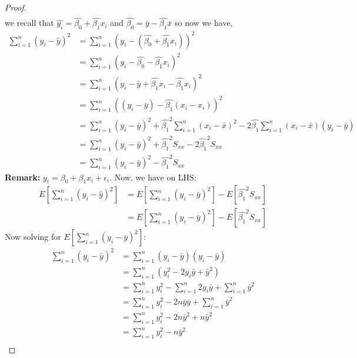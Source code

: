 \documentclass[12pt]{article}
\begin{document}
\begin{enumerate}[1.]
\begin{proof}
\begin{align*}
            \end{align*}
            we recall that $\hat{y_i} = \hat{\beta_0} + \hat{\beta_1}x_i$ and $\hat{\beta_0} = \bar{y} - \hat{\beta_1} \bar{x}$ so now we have,
            \begin{align*}
                \sum_{i=1}^{n} (y_i - \hat{y})^2 &= \sum_{i=1}^{n} (y_i - (\hat{\beta_0} + \hat{\beta_1}x_i))^2 \\
                &= \sum_{i=1}^{n} (y_i - \hat{\beta_0} - \hat{\beta_1}x_i)^2 \\
                &= \sum_{i=1}^{n} (y_i - \bar{y} + \hat{\beta_1} x_i - \hat{\beta_1}x_i)^2 \\
                &= \sum_{i=1}^{n} ((y_i - \bar{y}) - \hat{\beta_1} (x_i - x_i))^2 \\
                &=\sum_{i=1}^{n} (y_i-\bar{y})^2 + \hat{\beta_1}^2 \sum_{i=1}^{n} (x_i-\bar{x})^2 - 2\hat{\beta_1} \sum_{i=1}^{n} (x_i-\bar{x})(y_i-\bar{y})\\
                &=\sum_{i=1}^{n} (y_i-\bar{y})^2 + \hat{\beta_1}^2 S_{xx} - 2\hat{\beta_1}^2 S_{xx}\\
                &=\sum_{i=1}^{n} (y_i-\bar{y})^2 - \hat{\beta_1}^2 S_{xx}
            \end{align*}
            \textbf{Remark:} $y_i=\beta_0+\beta_1x_i+\epsilon_i$. Now, we have on LHS$\colon$
            \begin{align*}
                E[\sum_{i=1}^{n} (y_i - \hat{y})^2] &= E[\sum_{i=1}^{n} (y_i-\bar{y})^2] - E[\hat{\beta_1}^2 S_{xx}] \\
                &= E[\sum_{i=1}^{n} (y_i-\bar{y})^2] - E[\hat{\beta_1}^2 S_{xx}]
            \end{align*}
            Now solving for $E[\sum_{i=1}^{n} (y_i-\bar{y})^2]$:
            \begin{align*}
                \sum_{i=1}^{n} (y_i-\bar{y})^2 &= \sum_{i=1}^{n} (y_i - \bar{y})(y_i - \bar{y}) \\
                &= \sum_{i=1}^{n} (y_i^2 - 2y_i\bar{y} + \bar{y}^2) \\
                &= \sum_{i=1}^{n}y_i^2 - \sum_{i=1}^{n}2y_i\bar{y} + \sum_{i=1}^{n} \bar{y}^2 \\
                &= \sum_{i=1}^{n}y_i^2 - 2n\bar{y}\bar{y} + \sum_{i=1}^{n} \bar{y}^2 \\
                &= \sum_{i=1}^{n}y_i^2 - 2n\bar{y}^2 + n\bar{y}^2 \\
                &= \sum_{i=1}^{n}y_i^2 - n\bar{y}^2 \\

\end{align*}
\end{proof}
\end{enumerate}
\end{document}
